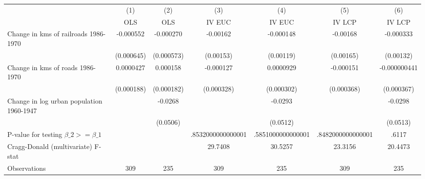 {
\def\sym#1{\ifmmode^{#1}\else\(^{#1}\)\fi}
\begin{tabular}{l*{6}{c}}
\hline\hline
                &\multicolumn{1}{c}{(1)}&\multicolumn{1}{c}{(2)}&\multicolumn{1}{c}{(3)}&\multicolumn{1}{c}{(4)}&\multicolumn{1}{c}{(5)}&\multicolumn{1}{c}{(6)}\\
                &\multicolumn{1}{c}{OLS}&\multicolumn{1}{c}{OLS}&\multicolumn{1}{c}{IV EUC}&\multicolumn{1}{c}{IV EUC}&\multicolumn{1}{c}{IV LCP}&\multicolumn{1}{c}{IV LCP}\\
\hline
Change in kms of railroads 1986-1970&-0.000552         &-0.000270         & -0.00162         &-0.000148         & -0.00168         &-0.000333         \\
                &(0.000645)         &(0.000573)         &(0.00153)         &(0.00119)         &(0.00165)         &(0.00132)         \\
[1em]
Change in kms of roads 1986-1970&0.0000427         & 0.000158         &-0.000127         &0.0000929         &-0.000151         &-0.000000441         \\
                &(0.000188)         &(0.000182)         &(0.000328)         &(0.000302)         &(0.000368)         &(0.000367)         \\
[1em]
Change in log urban population 1960-1947&                  &  -0.0268         &                  &  -0.0293         &                  &  -0.0298         \\
                &                  & (0.0506)         &                  & (0.0512)         &                  & (0.0513)         \\
\hline
P-value for testing $\beta\_{2} >= \beta\_{1}$&                  &                  &.8532000000000001         &.5851000000000001         &.8482000000000001         &    .6117         \\
Cragg-Donald (multivariate) F-stat&                  &                  &  29.7408         &  30.5257         &  23.3156         &  20.4473         \\
Observations    &      309         &      235         &      309         &      235         &      309         &      235         \\
\hline\hline
\end{tabular}
}
